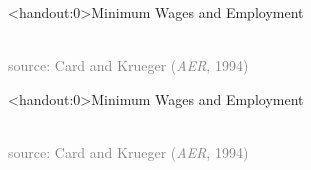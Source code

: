 \documentclass[10pt,xcolor=table,ignorenonframetext,handout,aspectratio=169]{beamer}
\begin{document}

\begin{frame}<handout:0>{Minimum Wages and Employment}

\begin{center}
	\\
	\textcolor{gray}{\tiny{source:  Card and Krueger (\emph{AER}, 1994)}}
\end{center}

\end{frame}



\begin{frame}<handout:0>{Minimum Wages and Employment}

\begin{center}
	\\
	\textcolor{gray}{\tiny{source:  Card and Krueger (\emph{AER}, 1994)}}
\end{center}

\end{frame}


\end{document}
